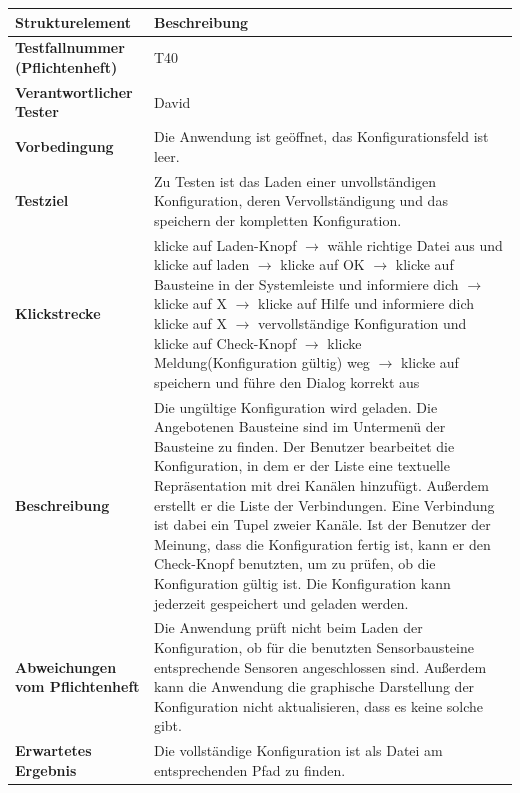 \documentclass[parskip=full]{scrartcl}
\begin{document}
\begin{table}[h]
\begin{tabular}{| p{4cm} | p{10cm} |}
	\hline
	\textbf{Strukturelement} & \textbf{Beschreibung} \\ \hline
	\textbf{Testfallnummer (Pflichtenheft)}
	& 
	T40
	\\ \hline
	\textbf{Verantwortlicher Tester}
	& 
	David
	\\ \hline
	\textbf{Vorbedingung}
	& 
	Die Anwendung ist geöffnet, das Konfigurationsfeld ist leer.
	\\ \hline
	\textbf{ Testziel}
	& 
	Zu Testen ist das Laden einer unvollständigen Konfiguration, deren Vervollständigung und das speichern der kompletten Konfiguration.
	\\ \hline
	
	\textbf{Klickstrecke}
	& 
	klicke auf Laden-Knopf $\rightarrow$ wähle richtige Datei aus und klicke auf laden $\rightarrow$ klicke auf OK $\rightarrow$ klicke auf Bausteine in der Systemleiste und informiere dich $\rightarrow$ klicke auf X $\rightarrow$ klicke auf Hilfe und informiere dich klicke auf X $\rightarrow$ vervollständige Konfiguration und klicke auf Check-Knopf $\rightarrow$ klicke Meldung(Konfiguration gültig) weg $\rightarrow$ klicke auf speichern und führe den Dialog korrekt aus
	\\ \hline
	
	\textbf{ Beschreibung}
	& 
	Die ungültige Konfiguration wird geladen. Die Angebotenen Bausteine sind im Untermenü der Bausteine zu finden. Der Benutzer bearbeitet die Konfiguration, in dem er der Liste eine textuelle Repräsentation mit drei Kanälen hinzufügt. Außerdem erstellt er die Liste der Verbindungen. Eine Verbindung ist dabei ein Tupel zweier Kanäle. Ist der Benutzer der Meinung, dass die Konfiguration fertig ist, kann er den Check-Knopf benutzten, um zu prüfen, ob die Konfiguration gültig ist. Die Konfiguration kann jederzeit gespeichert und geladen werden.
	\\ \hline
	
	\textbf{Abweichungen vom Pflichtenheft}
	& 
	Die Anwendung prüft nicht beim Laden der Konfiguration, ob für die benutzten Sensorbausteine entsprechende Sensoren angeschlossen sind. Außerdem kann die Anwendung die graphische Darstellung der Konfiguration nicht aktualisieren, dass es keine solche gibt.

	\\ \hline
	
	\textbf{Erwartetes Ergebnis}
	& 
	Die vollständige Konfiguration ist als Datei am entsprechenden Pfad zu finden.
	\\ \hline
			

\end{tabular}
\end{table}
\end{document}
